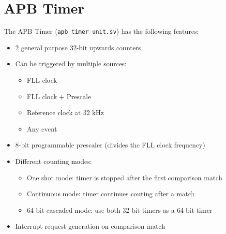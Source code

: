 \section{APB Timer}

The APB Timer (\texttt{apb\_timer\_unit.sv}) has the following features:
\begin{itemize}
\item 2 general purpose 32-bit upwards counters
\item Can be triggered by multiple sources:
  \begin{itemize}
  \item FLL clock
  \item FLL clock + Prescale
  \item Reference clock at 32 kHz
  \item Any event
  \end{itemize}
\item 8-bit programmable prescaler (divides the FLL clock frequency)
\item Different counting modes:
  \begin{itemize}
  \item One shot mode: timer is stopped after the first comparison match
  \item Continuous mode: timer continues couting after a match
  \item 64-bit cascaded mode: use both 32-bit timers as a 64-bit timer
  \end{itemize}
\item Interrupt request generation on comparison match
\end{itemize}

